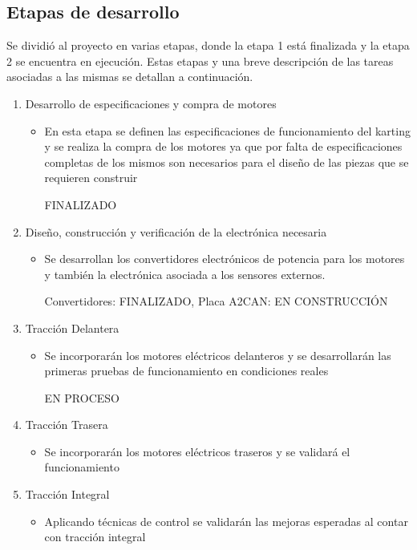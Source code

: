 \documentclass[a4paper]{article}
\begin{document}
\subsection{Etapas de desarrollo}
Se dividió al proyecto en varias etapas, donde la etapa 1 está finalizada y la etapa 2 se encuentra en ejecución. Estas etapas y una breve descripción de las tareas asociadas a las mismas se detallan a continuación.
\begin{enumerate}
    \item Desarrollo de especificaciones y compra de motores
    \begin{itemize}
        \item En esta etapa se definen las especificaciones de funcionamiento del karting y se realiza la compra de los motores ya que por falta de especificaciones completas de los mismos son necesarios para el diseño de las piezas que se requieren construir \par FINALIZADO
    \end{itemize}
    \item Diseño, construcción y verificación de la electrónica necesaria
    \begin{itemize}
        \item Se desarrollan los convertidores electrónicos de potencia para los motores y también la electrónica asociada a los sensores externos. \par Convertidores: FINALIZADO, Placa A2CAN: EN CONSTRUCCIÓN
    \end{itemize}    
    \item Tracción Delantera
    \begin{itemize}
        \item Se incorporarán los motores eléctricos delanteros y se desarrollarán las primeras pruebas de funcionamiento en condiciones reales \par EN PROCESO
    \end{itemize}
    \item Tracción Trasera
    \begin{itemize}
        \item Se incorporarán los motores eléctricos traseros y se validará el funcionamiento
    \end{itemize}    
    \item Tracción Integral
    \begin{itemize}
        \item Aplicando técnicas de control se validarán las mejoras esperadas al contar con tracción integral
    \end{itemize}    

\end{enumerate}
\end{document}
